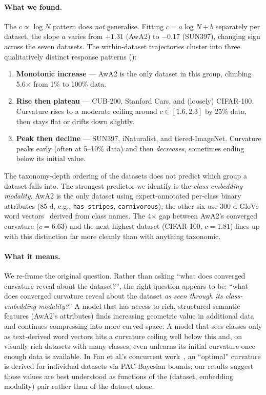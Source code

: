 \documentclass{article}
\begin{document}
\paragraph{What we found.}
The $c \propto \log N$ pattern does \emph{not} generalise.
Fitting $c = a \log N + b$ separately per dataset, the slope $a$ varies from $+1.31$ (AwA2) to $-0.17$ (SUN397), changing sign across the seven datasets.
The within-dataset trajectories cluster into three qualitatively distinct response patterns ():
\begin{enumerate}
    \item \textbf{Monotonic increase} --- AwA2 is the only dataset in this group, climbing 5.6$\times$ from 1\% to 100\% data.
    \item \textbf{Rise then plateau} --- CUB-200, Stanford Cars, and (loosely) CIFAR-100. Curvature rises to a moderate ceiling around $c \in [1.6, 2.3]$ by 25\% data, then stays flat or drifts down slightly.
    \item \textbf{Peak then decline} --- SUN397, iNaturalist, and tiered-ImageNet. Curvature peaks early (often at 5--10\% data) and then \emph{decreases}, sometimes ending below its initial value.
\end{enumerate}
The taxonomy-depth ordering of the datasets does not predict which group a dataset falls into.
The strongest predictor we identify is the \emph{class-embedding modality}.
AwA2 is the only dataset using expert-annotated per-class binary attributes (85-d, e.g., \texttt{has\_stripes}, \texttt{carnivorous}); the other six use 300-d GloVe word vectors~\cite{pennington2014glove} derived from class names.
The 4$\times$ gap between AwA2's converged curvature ($c=6.63$) and the next-highest dataset (CIFAR-100, $c=1.81$) lines up with this distinction far more cleanly than with anything taxonomic.

\paragraph{What it means.}
We re-frame the original question.
Rather than asking ``what does converged curvature reveal about the dataset?'', the right question appears to be: ``what does converged curvature reveal about the dataset \emph{as seen through its class-embedding modality?}''
A model that has access to rich, structured semantic features (AwA2's attributes) finds increasing geometric value in additional data and continues compressing into more curved space.
A model that sees classes only as text-derived word vectors hits a curvature ceiling well below this and, on visually rich datasets with many classes, even unlearns its initial curvature once enough data is available.
In Fan et al.'s concurrent work~\cite{fan2025curvature}, an ``optimal'' curvature is derived for individual datasets via PAC-Bayesian bounds; our results suggest those values are best understood as functions of the (dataset, embedding modality) pair rather than of the dataset alone.
\end{document}
